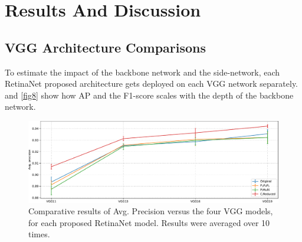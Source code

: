 \chapter{Results And Discussion} \label{Chapter:Results}

\section{VGG Architecture Comparisons}
To estimate the impact of the backbone network and the side-network, each RetinaNet proposed architecture gets deployed on each VGG network separately.  and \ref{fig8} show how AP and the F1-score scales with the depth of the backbone network.   

\begin{figure}[!htb]
  \centering
  \includegraphics[width=\textwidth]{figures/ch3/fig7.pdf}
  \caption{Comparative results of Avg. Precision versus the four VGG models, for each proposed RetinaNet model. Results were averaged over 10 times.}
  \label{fig7}
\end{figure}

\begin{table}[!htb]
  \centering
  \caption{Indicative values of Avg. Precision for the selected four VGG models, for each proposed RetinaNet model (). Parentheses indicate the input resolution.}
  \label{tab3}
\end{table}

